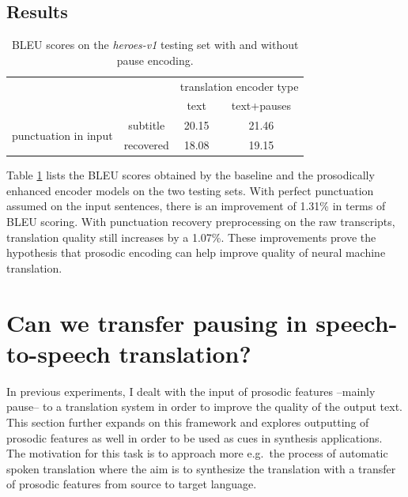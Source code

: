 \subsection*{Results}

\begin{table}[h!]
\begin{center}
\begin{tabular}{|c|c|c|c|}
\cline{3-4}
\multicolumn{2}{c|}{} & \multicolumn{2}{c|}{translation encoder type} \\
\cline{3-4}
\multicolumn{2}{c|}{} & text & text+pauses \\
\hline
\multirow{2}{*}{ punctuation in input} & subtitle & 20.15 & 21.46  \\
\cline{2-4}
& recovered & 18.08 & 19.15  \\
\hline
\end{tabular}
\end{center}
\caption{BLEU scores on the \textit{heroes-v1} testing set with and without pause encoding. }
\label{table:transProse_Q2}
\end{table}


Table \ref{table:transProse_Q2} lists the BLEU scores obtained by the baseline and the prosodically enhanced encoder models on the two testing sets. With perfect punctuation assumed on the input sentences, there is an improvement of 1.31\% in terms of BLEU scoring. With punctuation recovery preprocessing on the raw transcripts, translation quality still increases by a 1.07\%. These improvements prove the hypothesis that prosodic encoding can help improve quality of neural machine translation. 

\section{Can we transfer pausing in speech-to-speech translation?}
\label{transProse:Q3}

In previous experiments, I dealt with the input of prosodic features --mainly pause-- to a translation system in order to improve the quality of the output text. This section further expands on this framework and explores outputting of prosodic features as well in order to be used as cues in synthesis applications. The motivation for this task is to approach more e.g.~the process of automatic spoken translation where the aim is to synthesize the translation with a transfer of prosodic features from source to target language. 

